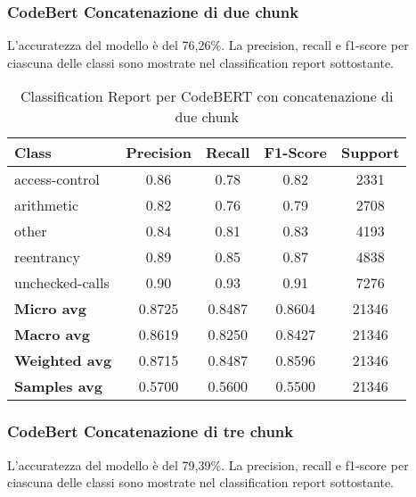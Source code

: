 \documentclass[../../Thesis.tex]{subfiles}
\begin{document}
\subsubsection{CodeBert Concatenazione di due chunk}
L'accuratezza del modello è del 76,26\%. La precision, recall e f1-score per ciascuna delle classi sono mostrate nel classification report sottostante.

\begin{table}[H]
    \centering
    \small
    \begin{tabular}{lcccc}
    \hline
    \textbf{Class} & \textbf{Precision} & \textbf{Recall} & \textbf{F1-Score} & \textbf{Support} \\
    \hline
    access-control & 0.86 & 0.78 & 0.82 & 2331 \\
    arithmetic & 0.82 & 0.76 & 0.79 & 2708 \\
    other & 0.84 & 0.81 & 0.83 & 4193 \\
    reentrancy & 0.89 & 0.85 & 0.87 & 4838 \\
    unchecked-calls & 0.90 & 0.93 & 0.91 & 7276 \\
    \hline
    \textbf{Micro avg} & 0.8725 & 0.8487 & 0.8604 & 21346 \\
    \textbf{Macro avg} & 0.8619 & 0.8250 & 0.8427 & 21346 \\
    \textbf{Weighted avg} & 0.8715 & 0.8487 & 0.8596 & 21346 \\
    \textbf{Samples avg} & 0.5700 & 0.5600 & 0.5500 & 21346 \\
    \hline
    \end{tabular}
    \caption{Classification Report per CodeBERT con concatenazione di due chunk}
    \end{table}
\subsubsection{CodeBert Concatenazione di tre chunk}
L'accuratezza del modello è del 79,39\%. La precision, recall e f1-score per ciascuna delle classi sono mostrate nel classification report sottostante.
\end{document}
